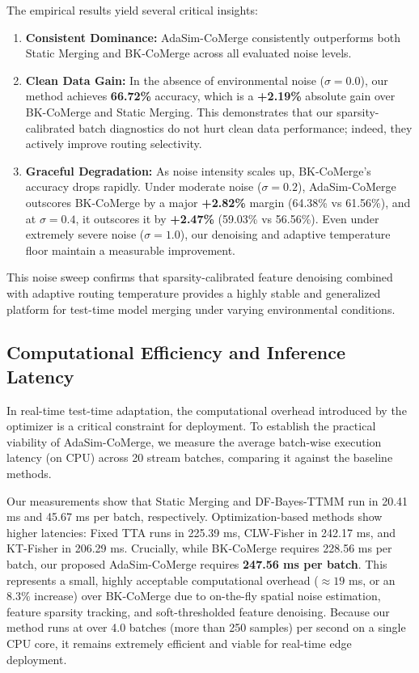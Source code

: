 \documentclass{article}
\theoremstyle{plain}
\theoremstyle{definition}
\theoremstyle{remark}
\begin{document}
The empirical results yield several critical insights:
\begin{enumerate}
    \item \textbf{Consistent Dominance:} AdaSim-CoMerge consistently outperforms both Static Merging and BK-CoMerge across all evaluated noise levels.
    \item \textbf{Clean Data Gain:} In the absence of environmental noise ($\sigma = 0.0$), our method achieves \textbf{66.72\%} accuracy, which is a \textbf{+2.19\%} absolute gain over BK-CoMerge and Static Merging. This demonstrates that our sparsity-calibrated batch diagnostics do not hurt clean data performance; indeed, they actively improve routing selectivity.
    \item \textbf{Graceful Degradation:} As noise intensity scales up, BK-CoMerge's accuracy drops rapidly. Under moderate noise ($\sigma = 0.2$), AdaSim-CoMerge outscores BK-CoMerge by a major \textbf{+2.82\%} margin (64.38\% vs 61.56\%), and at $\sigma = 0.4$, it outscores it by \textbf{+2.47\%} (59.03\% vs 56.56\%). Even under extremely severe noise ($\sigma = 1.0$), our denoising and adaptive temperature floor maintain a measurable improvement.
\end{enumerate}
This noise sweep confirms that sparsity-calibrated feature denoising combined with adaptive routing temperature provides a highly stable and generalized platform for test-time model merging under varying environmental conditions.

\subsection{Computational Efficiency and Inference Latency}
In real-time test-time adaptation, the computational overhead introduced by the optimizer is a critical constraint for deployment. To establish the practical viability of AdaSim-CoMerge, we measure the average batch-wise execution latency (on CPU) across 20 stream batches, comparing it against the baseline methods.

Our measurements show that Static Merging and DF-Bayes-TTMM run in 20.41 ms and 45.67 ms per batch, respectively. Optimization-based methods show higher latencies: Fixed TTA runs in 225.39 ms, CLW-Fisher in 242.17 ms, and KT-Fisher in 206.29 ms. Crucially, while BK-CoMerge requires 228.56 ms per batch, our proposed AdaSim-CoMerge requires \textbf{247.56 ms per batch}. This represents a small, highly acceptable computational overhead ($\approx 19$ ms, or an $8.3\%$ increase) over BK-CoMerge due to on-the-fly spatial noise estimation, feature sparsity tracking, and soft-thresholded feature denoising. Because our method runs at over 4.0 batches (more than 250 samples) per second on a single CPU core, it remains extremely efficient and viable for real-time edge deployment.
\end{document}

